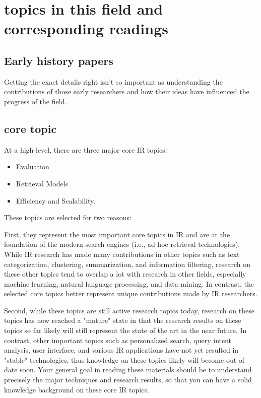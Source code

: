 \documentclass[•]{article}
\begin{document}
\section{topics in this field and corresponding readings}
\cite{CS598CXZreadings}

\subsection{Early history papers}
Getting the exact details right isn't so important as understanding the contributions of those early researchers and how their ideas have influenced the progress of the field.

\subsection{core topic}
At a high-level, there are three major core IR topics:

\begin{itemize}
\item Evaluation
\item Retrieval Models
\item Efficiency and Scalability. 
\end{itemize}


These topics are selected for two reasons: 

First, they represent the most important core topics in IR and are at the foundation of the modern search engines (i.e., ad hoc retrieval technologies). While IR research has made many contributions in other topics such as text categorization, clustering, summarization, and information filtering, research on these other topics tend to overlap a lot with research in other fields, especially machine learning, natural language processing, and data mining. In contrast, the selected core topics better represent unique contributions made by IR researchers. 

Second, while these topics are still active research topics today, research on these topics has now reached a "mature" state in that the research results on these topics so far likely will still represent the state of the art in the near future. In contrast, other important topics such as personalized search, query intent analysis, user interface, and various IR applications have not yet resulted in "stable" technologies, thus knowledge on these topics likely will become out of date soon. Your general goal in reading these materials should be to understand precisely the major techniques and research results, so that you can have a solid knowledge background on these core IR topics.
\end{document}
